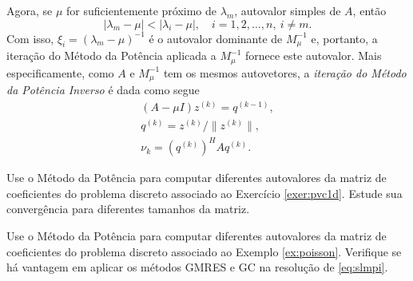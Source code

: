 Agora, se $\mu$ for suficientemente próximo de $\lambda_m$, autovalor simples de $A$, então
\begin{equation}
  |\lambda_m-\mu| < |\lambda_i-\mu|,\quad i=1,2,\dotsc,n,~i\neq m.
\end{equation}
Com isso, $\xi_i=(\lambda_m-\mu)^{-1}$ é o autovalor dominante de $M_\mu^{-1}$ e, portanto, a iteração do Método da Potência aplicada a $M_\mu^{-1}$ fornece este autovalor. Mais especificamente, como $A$ e $M_\mu^{-1}$ tem os  mesmos autovetores, a \emph{iteração do Método da Potência Inverso} é dada como segue
\begin{gather}
  (A-\mu I)z^{(k)} = q^{(k-1)}, \label{eq:slmpi}\\
  q^{(k)}=z^{(k)}/\|z^{(k)}\|,\\
  \nu_k = (q^{(k)})^H A q^{(k)}.
\end{gather}


\begin{exer}
  Use o Método da Potência para computar diferentes autovalores da matriz de coeficientes do problema discreto associado ao Exercício \ref{exer:pvc1d}. Estude sua convergência para diferentes tamanhos da matriz. 
\end{exer}

\begin{exer}
  Use o Método da Potência para computar diferentes autovalores da matriz de coeficientes do problema discreto associado ao Exemplo \ref{ex:poisson}. Verifique se há vantagem em aplicar os métodos GMRES e GC na resolução de \eqref{eq:slmpi}.
\end{exer}
